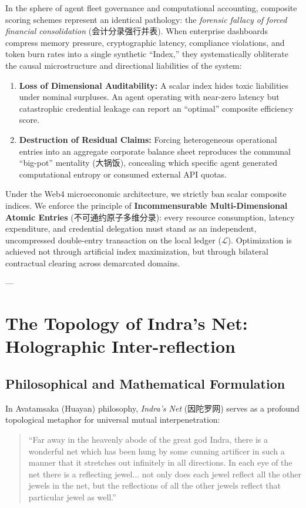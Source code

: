 \documentclass[11pt,a4paper]{article}
\begin{document}
In the sphere of agent fleet governance and computational accounting, composite scoring schemes represent an identical pathology: the \textit{forensic fallacy of forced financial consolidation} (会计分录强行并表). When enterprise dashboards compress memory pressure, cryptographic latency, compliance violations, and token burn rates into a single synthetic ``Index,'' they systematically obliterate the causal microstructure and directional liabilities of the system:
\begin{enumerate}
    \item \textbf{Loss of Dimensional Auditability:} A scalar index hides toxic liabilities under nominal surpluses. An agent operating with near-zero latency but catastrophic credential leakage can report an ``optimal'' composite efficiency score.
    \item \textbf{Destruction of Residual Claims:} Forcing heterogeneous operational entries into an aggregate corporate balance sheet reproduces the communal ``big-pot'' mentality (大锅饭), concealing which specific agent generated computational entropy or consumed external API quotas.
\end{enumerate}

Under the Web4 microeconomic architecture, we strictly ban scalar composite indices. We enforce the principle of \textbf{Incommensurable Multi-Dimensional Atomic Entries} (不可通约原子多维分录): every resource consumption, latency expenditure, and credential delegation must stand as an independent, uncompressed double-entry transaction on the local ledger ($\mathcal{L}$). Optimization is achieved not through artificial index maximization, but through bilateral contractual clearing across demarcated domains.

---

\section{The Topology of Indra's Net: Holographic Inter-reflection}

\subsection{Philosophical and Mathematical Formulation}

In Avatamsaka (Huayan) philosophy, \textit{Indra's Net} (因陀罗网) serves as a profound topological metaphor for universal mutual interpenetration:
\begin{quote}
``Far away in the heavenly abode of the great god Indra, there is a wonderful net which has been hung by some cunning artificer in such a manner that it stretches out infinitely in all directions. In each eye of the net there is a reflecting jewel... not only does each jewel reflect all the other jewels in the net, but the reflections of all the other jewels reflect that particular jewel as well.''
\end{quote}
\end{document}
